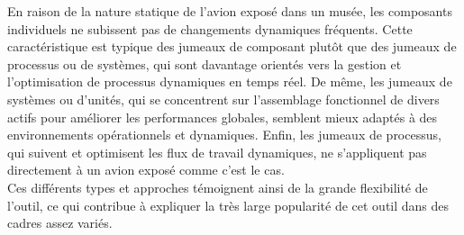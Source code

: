 En raison de la nature statique de l'avion exposé dans un musée, les composants individuels ne subissent pas de changements dynamiques fréquents. Cette caractéristique est typique des jumeaux de composant plutôt que des jumeaux de processus ou de systèmes, qui sont davantage orientés vers la gestion et l'optimisation de processus dynamiques en temps réel.  De même, les jumeaux de systèmes ou d'unités, qui se concentrent sur l'assemblage fonctionnel de divers actifs pour améliorer les performances globales, semblent mieux adaptés à des environnements opérationnels et dynamiques. Enfin, les jumeaux de processus, qui suivent et optimisent les flux de travail dynamiques, ne s'appliquent pas directement à un avion exposé comme c'est le cas.\\

Ces différents types et approches témoignent ainsi de la grande flexibilité de l'outil, ce qui contribue à expliquer la très large popularité de cet outil dans des cadres assez variés.\\


